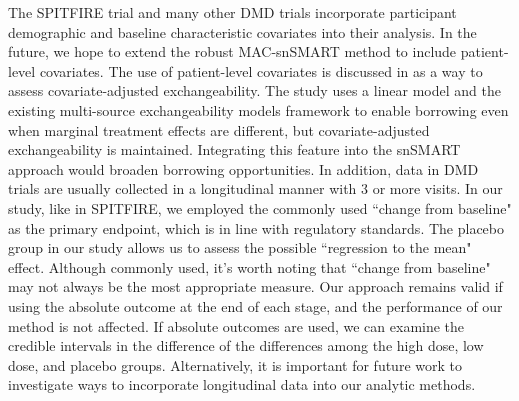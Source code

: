 The SPITFIRE trial and many other \ac{DMD} trials incorporate participant demographic and baseline characteristic covariates into their analysis. In the future, we hope to extend the robust MAC-snSMART method to include patient-level covariates. The use of patient-level covariates is discussed in \cite{kotalik2021dynamic} as a way to assess covariate-adjusted exchangeability. The study uses a linear model and the existing multi-source exchangeability models framework to enable borrowing even when marginal treatment effects are different, but covariate-adjusted exchangeability is maintained. Integrating this feature into the \ac{snSMART} approach would broaden borrowing opportunities. In addition, data in \ac{DMD} trials are usually collected in a longitudinal manner with 3 or more visits. In our study, like in SPITFIRE, we employed the commonly used ``change from baseline" as the primary endpoint, which is in line with regulatory standards. The placebo group in our study allows us to assess the possible ``regression to the mean" effect. Although commonly used, it's worth noting that ``change from baseline" may not always be the most appropriate measure. Our approach remains valid if using the absolute outcome at the end of each stage, and the performance of our method is not affected. If absolute outcomes are used, we can examine the credible intervals in the difference of the differences among the high dose, low dose, and placebo groups. Alternatively, it is important for future work to investigate ways to incorporate longitudinal data into our analytic methods.